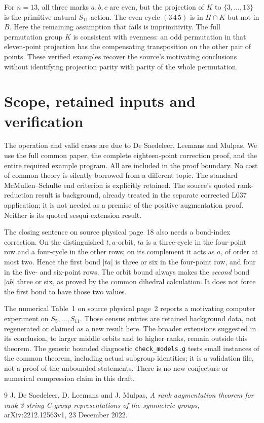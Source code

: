 \documentclass[a4paper,11pt]{article}
\begin{document}
For $n=13$, all three marks $a,b,c$ are even, but the projection of $K$
to $\{3,\ldots,13\}$ is the primitive natural $S_{11}$ action.
The even cycle $(3\,4\,5)$ is in $H\cap K$ but not in $B$.
Here the remaining assumption that fails is imprimitivity.
The full permutation group $K$ is consistent with evenness: an odd
permutation in that eleven-point projection has the compensating
transposition on the other pair of points. These verified examples
recover the source's motivating conclusions without identifying
projection parity with parity of the whole permutation.

\section{Scope, retained inputs and verification}
The operation and valid cases are due to De Saedeleer, Leemans and
Mulpas. We use the full common paper, the complete eighteen-point
correction proof, and the entire required example program. All are
included in the proof boundary. No cost of common theory is silently
borrowed from a different topic. The standard McMullen--Schulte end
criterion is explicitly retained. The source's quoted rank-reduction
result is background, already treated in the separate corrected L037
application; it is not needed as a premise of the positive augmentation
proof. Neither is its quoted sesqui-extension result.

The closing sentence on source physical page~18 also needs a bond-index
correction. On the distinguished $t,a$-orbit, $ta$ is a three-cycle in
the four-point row and a four-cycle in the other rows; on its complement
it acts as $a$, of order at most two. Hence the first bond $|ta|$ is three
or six in the four-point row, and four in the five- and six-point rows.
The orbit bound always makes the \emph{second} bond $|ab|$ three or six,
as proved by the common dihedral calculation. It does not force the
first bond to have those two values.

The numerical Table~1 on source physical page~2 reports a motivating
computer experiment on $S_5,\ldots,S_{11}$. Those census entries are
retained background data, not regenerated or claimed as a new result
here. The broader extensions suggested in its conclusion, to larger
middle orbits and to higher ranks, remain outside this theorem.
The generic bounded diagnostic \texttt{check\_models.g} tests small
instances of the common theorem, including actual subgroup identities;
it is a validation file, not a proof of the unbounded statements.
There is no new conjecture or numerical compression claim in this draft.

\begin{thebibliography}{9}
 J. De Saedeleer, D. Leemans and J. Mulpas,
\emph{A rank augmentation theorem for rank 3 string C-group representations
of the symmetric groups}, arXiv:2212.12563v1, 23 December 2022.
\end{thebibliography}
\end{document}
